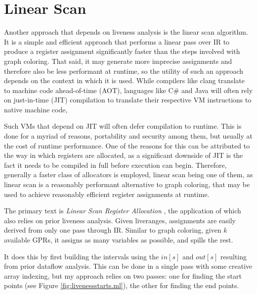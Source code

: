 \documentclass{article}
\begin{document}
\section{Linear Scan}
Another approach that depends on liveness analysis is the linear scan algorithm.
It is a simple and efficient approach that performs a linear pass over IR to produce a register assignment significantly faster than the steps involved with graph coloring.
That said, it may generate more imprecise assignments and therefore also be less performant at runtime, so the utility of such an approach depends on the context in which it is used.
While compilers like clang translate to machine code ahead-of-time (AOT), languages like C\# and Java will often rely on just-in-time (JIT) compilation to translate their respective VM instructions to native machine code,

Such VMs that depend on JIT will often defer compilation to runtime. This is done for a myriad of reasons, portability and security among them, but usually at the cost of runtime performance. One of the reasons for this can be attributed to the way in which registers are allocated, as a significant downside of JIT is the fact it needs to be compiled in full before execution can begin. Therefore, generally a faster class of allocators is employed, linear scan being one of them, as linear scan is a reasonably performant alternative to graph coloring, that may be used to achieve reasonably efficient register assignments at runtime.

The primary text is \textit{Linear Scan Register Allocation} \cite{linear}, the application of which also relies on prior liveness analysis. Given liveranges, assignments are easily derived from only one pass through IR.
Similar to graph coloring, given \(k\) available GPRs, it assigns  as many variables as possible, and spills the rest.

It does this by first building the intervals using the \(\mathit{in}[s]\) and \(\mathit{out}[s]\) resulting from prior dataflow analysis.
This can be done in a single pass with some creative array indexing, but my approach relies on two passes: one for finding the start points (see Figure \ref{fig:livenessstarts.ml}), the other for finding the end points.
\end{document}
